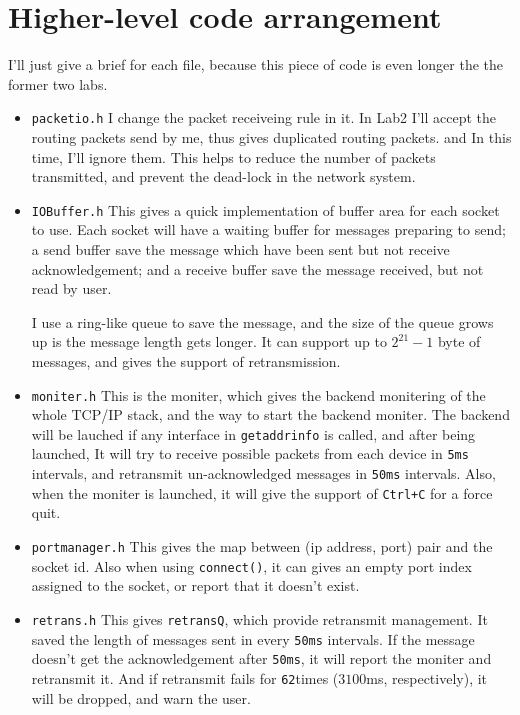 \documentclass[11pt]{article}
\begin{document}
	\section{Higher-level code arrangement}
	
		\par I'll just give a brief for each file, because this piece of code is even longer the the former two labs.
		
		\begin{itemize}
			\item \texttt{packetio.h} I change the packet receiveing rule in it. In Lab2 I'll accept the routing packets send by me, thus gives duplicated routing packets. and In this time, I'll ignore them. This helps to reduce the number of packets transmitted, and prevent the dead-lock in the network system.
			
			\item \texttt{IOBuffer.h} This gives a quick implementation of buffer area for each socket to use. Each socket will have a waiting buffer for messages preparing to send; a send buffer save the message which have been sent but not receive acknowledgement; and a receive buffer save the message received, but not read by user.
			
			I use a ring-like queue to save the message, and the size of the queue grows up is the message length gets longer. It can support up to $2^{21}-1$ byte of messages, and gives the support of retransmission.
			
			\item \texttt{moniter.h} This is the moniter, which gives the backend monitering of the whole TCP/IP stack, and the way to start the backend moniter. The backend will be lauched if any interface in \texttt{getaddrinfo} is called, and after being launched, It will try to receive possible packets from each device in \texttt{5ms} intervals, and retransmit un-acknowledged messages in \texttt{50ms} intervals. Also, when the moniter is launched, it will give the support of \texttt{Ctrl+C} for a force quit.
			
			\item \texttt{portmanager.h} This gives the map between (ip address, port) pair and the socket id. Also when using \texttt{connect()}, it can gives an empty port index assigned to the socket, or report that it doesn't exist.
			
			\item \texttt{retrans.h} This gives \texttt{retransQ}, which provide retransmit management. It saved the length of messages sent in every \texttt{50ms} intervals. If the message doesn't get the acknowledgement after \texttt{50ms}, it will report the moniter and retransmit it. And if retransmit fails for \texttt{62}times ($3100$ms, respectively), it will be dropped, and warn the user.
			

\end{itemize}
\end{document}
